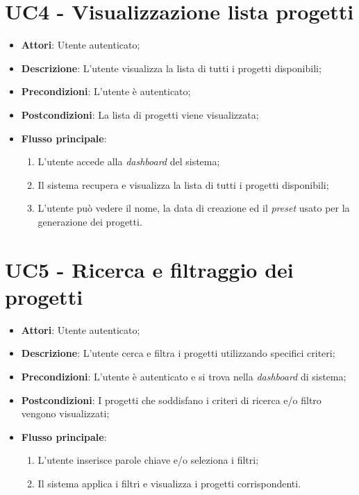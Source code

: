 \vspace{0.5cm}  
\section*{UC4 - Visualizzazione lista progetti}
\begin{itemize}
    \item \textbf{Attori}: Utente autenticato;
    \item \textbf{Descrizione}: L'utente visualizza la lista di tutti i progetti disponibili;
    \item \textbf{Precondizioni}: L'utente è autenticato;
    \item \textbf{Postcondizioni}: La lista di progetti viene visualizzata;
    \item \textbf{Flusso principale}:
    \begin{enumerate}
        \item L'utente accede alla \textit{dashboard} del sistema;
        \item Il sistema recupera e visualizza la lista di tutti i progetti disponibili;
        \item L'utente può vedere il nome, la data di creazione ed il \textit{preset} usato per la generazione dei progetti.
    \end{enumerate}
\end{itemize}

\vspace{0.5cm}  
\section*{UC5 - Ricerca e filtraggio dei progetti}
\begin{itemize}
    \item \textbf{Attori}: Utente autenticato;
    \item \textbf{Descrizione}: L'utente cerca e filtra i progetti utilizzando specifici criteri;
    \item \textbf{Precondizioni}: L'utente è autenticato e si trova nella \textit{dashboard} di sistema;
    \item \textbf{Postcondizioni}: I progetti che soddisfano i criteri di ricerca e/o filtro vengono visualizzati;
    \item \textbf{Flusso principale}:
    \begin{enumerate}
        \item L'utente inserisce parole chiave e/o seleziona i filtri;
        \item Il sistema applica i filtri e visualizza i progetti corrispondenti.
    \end{enumerate}
\end{itemize}

